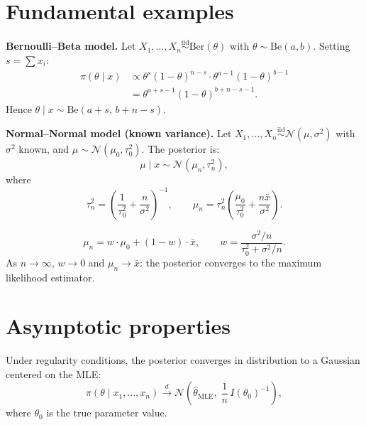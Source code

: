 \section{Fundamental examples}

\begin{example}
\textbf{Bernoulli--Beta model.}
Let $X_1, \ldots, X_n \overset{\text{iid}}{\sim} \text{Ber}(\theta)$
with $\theta \sim \text{Be}(a, b)$. Setting $s = \sum x_i$:
\begin{align*}
  \pi(\theta \mid x)
  &\propto \theta^s (1-\theta)^{n-s} \cdot \theta^{a-1}(1-\theta)^{b-1} \\
  &= \theta^{a+s-1}(1-\theta)^{b+n-s-1}.
\end{align*}
Hence $\theta \mid x \sim \text{Be}(a + s, \, b + n - s)$.
\end{example}

\begin{example}
\textbf{Normal--Normal model (known variance).}
Let $X_1, \ldots, X_n \overset{\text{iid}}{\sim} \mathcal{N}(\mu, \sigma^2)$
with $\sigma^2$ known, and $\mu \sim \mathcal{N}(\mu_0, \tau_0^2)$.
The posterior is:
\[
  \mu \mid x \sim \mathcal{N}(\mu_n, \tau_n^2),
\]
where
\[
  \tau_n^2 = \left(\frac{1}{\tau_0^2} + \frac{n}{\sigma^2}\right)^{-1}, \qquad
  \mu_n = \tau_n^2 \left(\frac{\mu_0}{\tau_0^2} + \frac{n\bar{x}}{\sigma^2}\right).
\]
\end{example}

\begin{keyformulas}[title=\textbf{Posterior mean as weighted average}]
\[
  \mu_n = w \cdot \mu_0 + (1-w) \cdot \bar{x},
  \qquad w = \frac{\sigma^2/n}{\tau_0^2 + \sigma^2/n}.
\]
As $n \to \infty$, $w \to 0$ and $\mu_n \to \bar{x}$: the posterior
converges to the maximum likelihood estimator.
\end{keyformulas}

\section{Asymptotic properties}

\begin{theorem}
Under regularity conditions, the posterior converges in distribution to
a Gaussian centered on the MLE:
\[
  \pi(\theta \mid x_1, \ldots, x_n)
  \xrightarrow{d}
  \mathcal{N}\!\left(\hat{\theta}_{\text{MLE}},\;
  \frac{1}{n}\,I(\theta_0)^{-1}\right),
\]
where $\theta_0$ is the true parameter value.
\end{theorem}

